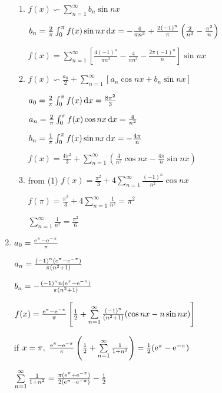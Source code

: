 \begin{enumerate}[1]
\begin{enumerate}[(1)]
        \item 
        \par $f(x)\backsim \sum \limits_{n=1}^{\infty}b_n\sin nx$
        \par $b_n=\frac{2}{\pi}\int_0^{\pi}f(x)\sin nx\dif x= - \frac{4}{\pi n^3} + \frac{2(-1)^n}{\pi}\left(\frac{2}{n^3} - \frac{\pi^2}{n}\right)$
        \par $f(x) = \sum \limits_{n=1}^{\infty}\left[\frac{4(-1)^n}{\pi n^3}- \frac{4}{\pi n^3} - \frac{2\pi(-1)^n}{n}  \right]\sin nx$

        \item 
        \par $ f(x)\backsim\frac{a_0}{2}+\sum \limits_{n=1}^{\infty}[a_n\cos nx+b_n\sin nx]$
        \par $a_0=\frac{2}{\pi}\int_0^{\pi}f(x)\dif x=\frac{8\pi^2}{3}$
        \par $a_n=\frac{2}{\pi}\int_0^{\pi}f(x)\cos nx\dif x=\frac{4}{n^2}$
        \par $b_n=\frac{1}{\pi}\int_0^{\pi}f(x)\sin nx\dif x= -\frac{4\pi}{n}$
        \par $f(x) = \frac{4\pi^2}{3} + \sum \limits_{n=1}^{\infty} \left(\frac{4}{n^2} \cos nx -\frac{4\pi}{n} \sin nx\right)$


        \item 
        from (1) $f(x) =  \frac{\pi^2}{3} + 4\sum \limits_{n=1}^{\infty} \frac{(-1)^n}{n^2} \cos nx$
        \par $f(\pi) =  \frac{\pi^2}{3} + 4\sum \limits_{n=1}^{\infty} \frac{1}{n^2} = \pi^2$
        \par $\sum \limits_{n=1}^{\infty} \frac{1}{n^2} = \frac{\pi^2}{6}$
    \end{enumerate}
    

    \item 
    \par $a_0=\frac{\mathrm{e}^{\pi}-\mathrm{e}^{-\pi}}{\pi}$
    \par $a_n=\frac{(-1)^n(\mathrm{e}^{\pi}-\mathrm{e}^{-\pi})}{\pi(n^2+1)}$
    \par $b_n=-\frac{(-1)^nn(\mathrm{e}^{\pi}-\mathrm{e}^{-\pi})}{\pi(n^2+1)}$
    \par $f(x) = \frac{\mathrm{e}^{\pi}-\mathrm{e}^{-\pi}}{\pi}\left[\frac{1}{2}+\sum \limits_{n=1}^{\infty} \frac{(-1)^n}{(n^2+1)} (\cos nx - n \sin nx)\right]$
    \par if $x=\pi,\ \frac{\mathrm{e}^\pi - \mathrm{e}^{-\pi}}{\pi}\left(\frac{1}{2}+\sum \limits_{n=1}^{\infty} \frac{1}{1+n^2} \right)=\frac{1}{2}(\mathrm{e}^\pi - \mathrm{e}^{-\pi})$
    \par $\sum \limits_{n=1}^{\infty}\frac{1}{1+n^2}=\frac{\pi(\mathrm{e}^{\pi}+\mathrm{e}^{-\pi})}{2(\mathrm{e}^{\pi}-\mathrm{e}^{-\pi})}-\frac{1}{2}$


\end{enumerate}
